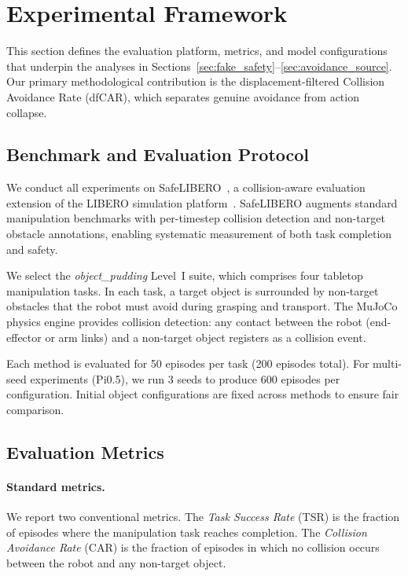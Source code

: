 \section{Experimental Framework}\label{sec:framework}

This section defines the evaluation platform, metrics, and model configurations that underpin the analyses in Sections~\ref{sec:fake_safety}--\ref{sec:avoidance_source}. Our primary methodological contribution is the displacement-filtered Collision Avoidance Rate (dfCAR), which separates genuine avoidance from action collapse.

\subsection{Benchmark and Evaluation Protocol}

We conduct all experiments on SafeLIBERO~\cite{hu2025vlsa}, a collision-aware evaluation extension of the LIBERO simulation platform~\cite{liu2023libero}. SafeLIBERO augments standard manipulation benchmarks with per-timestep collision detection and non-target obstacle annotations, enabling systematic measurement of both task completion and safety.

We select the \textit{object\_pudding} Level~I suite, which comprises four tabletop manipulation tasks. In each task, a target object is surrounded by non-target obstacles that the robot must avoid during grasping and transport. The MuJoCo physics engine provides collision detection: any contact between the robot (end-effector or arm links) and a non-target object registers as a collision event.

Each method is evaluated for 50 episodes per task (200 episodes total). For multi-seed experiments (Pi0.5), we run 3 seeds to produce 600 episodes per configuration. Initial object configurations are fixed across methods to ensure fair comparison.

\subsection{Evaluation Metrics}\label{sec:metrics}

\paragraph{Standard metrics.} We report two conventional metrics. The \emph{Task Success Rate} (TSR) is the fraction of episodes where the manipulation task reaches completion. The \emph{Collision Avoidance Rate} (CAR) is the fraction of episodes in which no collision occurs between the robot and any non-target object.

